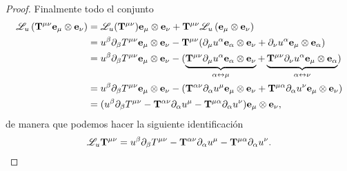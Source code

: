 \begin{proof}
Finalmente todo el conjunto
\begin{equation}
    \begin{aligned}
        \mathscr{L}_u \left( {\mathbf{T}}^{\mu \nu} \mathbf{e_\mu} \otimes \mathbf{e_\nu} \right) & = \mathscr{L}_u({\mathbf{T}}^{\mu \nu}) \mathbf{e_\mu} \otimes \mathbf{e_\nu} + {\mathbf{T}}^{\mu \nu} \mathscr{L}_u \left( \mathbf{e_\mu} \otimes \mathbf{e_\nu} \right)                                                                                                                                                                \\
                                                                                 & = u^\beta \partial_\beta T^{\mu \nu}  \mathbf{e_\mu} \otimes \mathbf{e_\nu}  - {\mathbf{T}}^{\mu \nu}( \partial_\mu u^\alpha \mathbf{e_\alpha} \otimes  \mathbf{e_\nu} +\partial_\nu u^\alpha \mathbf{e_\mu}\otimes\mathbf{e_\alpha} )                                                                                                      \\
                                                                                 & = u^\beta \partial_\beta T^{\mu \nu}  \mathbf{e_\mu} \otimes \mathbf{e_\nu}  - ( \underbrace{{\mathbf{T}}^{\mu \nu} \partial_\mu u^\alpha \mathbf{e_\alpha} \otimes  \mathbf{e_\nu} }_{\alpha \leftrightarrow \mu}+\underbrace{{\mathbf{T}}^{\mu \nu} \partial_\nu u^\alpha \mathbf{e_\mu}\otimes\mathbf{e_\alpha} }_{\alpha \leftrightarrow \nu}) \\
                                                                                 & = u^\beta \partial_\beta T^{\mu \nu}  \mathbf{e_\mu} \otimes \mathbf{e_\nu}  - ( {\mathbf{T}}^{\alpha \nu} \partial_\alpha u^\mu \mathbf{e_\mu} \otimes  \mathbf{e_\nu} +{\mathbf{T}}^{\mu \alpha} \partial_\alpha u^\nu \mathbf{e_\mu}\otimes\mathbf{e_\nu} )                                                                                     \\
                                                                                 & = (u^\beta \partial_\beta T^{\mu \nu}   -  {\mathbf{T}}^{\alpha \nu} \partial_\alpha u^\mu  -{\mathbf{T}}^{\mu \alpha} \partial_\alpha u^\nu  )\mathbf{e_\mu}\otimes\mathbf{e_\nu},
    \end{aligned}
\end{equation}
de manera que  podemos hacer la siguiente identificación
\begin{equation}
  \mathscr{L}_u {\mathbf{T}}^{\mu \nu} = u^\beta \partial_\beta T^{\mu \nu}   -  {\mathbf{T}}^{\alpha \nu} \partial_\alpha u^\mu  -{\mathbf{T}}^{\mu \alpha} \partial_\alpha u^\nu.
\end{equation}
\end{proof}

